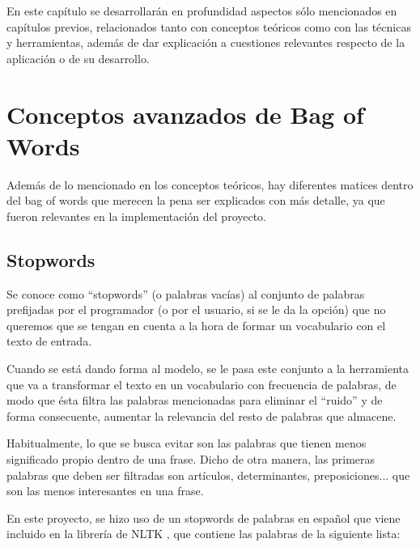 
En este capítulo se desarrollarán en profundidad aspectos sólo mencionados en capítulos previos, relacionados tanto con conceptos teóricos como con las técnicas y herramientas, además de dar explicación a cuestiones relevantes respecto de la aplicación o de su desarrollo.

\section{Conceptos avanzados de Bag of Words}

Además de lo mencionado en los conceptos teóricos, hay diferentes matices dentro del bag of words que merecen la pena ser explicados con más detalle, ya que fueron relevantes en la implementación del proyecto.

\subsection{Stopwords}

Se conoce como ``stopwords'' (o palabras vacías) al conjunto de palabras prefijadas por el programador (o por el usuario, si se le da la opción) que no queremos que se tengan en cuenta a la hora de formar un vocabulario con el texto de entrada. 

Cuando se está dando forma al modelo, se le pasa este conjunto a la herramienta que va a transformar el texto en un vocabulario con frecuencia de palabras, de modo que ésta filtra las palabras mencionadas para eliminar el ``ruido'' y de forma consecuente, aumentar la relevancia del resto de palabras que almacene.

Habitualmente, lo que se busca evitar son las palabras que tienen menos significado propio dentro de una frase. Dicho de otra manera, las primeras palabras que deben ser filtradas son artículos, determinantes, preposiciones... que son las menos interesantes en una frase.

En este proyecto, se hizo uso de un stopwords de palabras en español que viene incluido en la librería de NLTK \cite{nltk}, que contiene las palabras de la siguiente lista:

